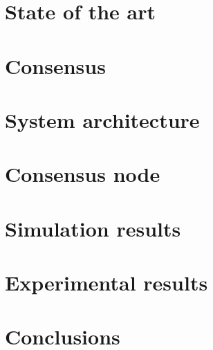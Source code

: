 \documentclass[a4paper,twoside,12pt]{book}
\begin{document}
\chapter{State of the art\label{chap:state_of_the_art}}


\chapter{Consensus\label{chap:consensus}}


\chapter{System architecture\label{chap:system_architecture}}


\chapter{Consensus node\label{chap:consensus_node}}


\chapter{Simulation results\label{chap:simulation_results}}


\chapter{Experimental results\label{chap:experimental_results}}


\chapter*{Conclusions}





\end{document}
